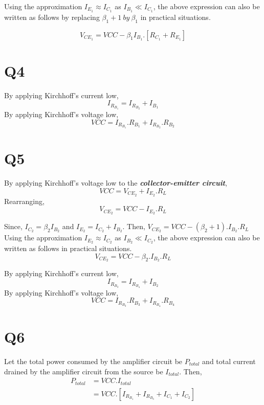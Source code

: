 Using the approximation $I_{E_1} \approx I_{C_1}$ as $I_{B_1} \ll I_{C_1}$, the above expression can also be written as follows by replacing $\beta_1 +1 ~by ~\beta_1$ in practical situations.

\[ V_{CE_1} =  VCC -\beta_1I_{B_1}.\left[R_{C_1} + R_{E_1} \right] \]


\section*{Q4}
%
By applying Kirchhoff's current low, \[I_{R_{B_1}} = I_{R_{B_2}}+I_{B_1}\]
By applying Kirchhoff's voltage low,
\[ VCC = I_{R_{B_1}}.R_{B_1} + I_{R_{B_2}}.R_{B_2} \]

\section*{Q5}
By applying Kirchhoff's voltage low to the \textbf{\textit{collector-emitter circuit}},
\[VCC = V_{CE_2} + I_{E_2}.R_L\]
Rearranging, \[ V_{CE_2} = VCC -  I_{E_2}.R_L \]

Since, $I_{C_2} = \beta_2 I_{B_2}$ and $I_{E_2} = I_{C_2} + I_{B_2}$. Then,
$ V_{CE_2} = VCC -  \left(\beta_2+1\right).I_{B_2}.R_L $\\

Using the approximation $I_{E_2} \approx I_{C_2}$ as $I_{B_2} \ll I_{C_2}$, the above expression can also be written as follows in practical situations.
\[ V_{CE_2} = VCC -  \beta_2.I_{B_2}.R_L \]

By applying Kirchhoff's current low, \[I_{R_{B_3}} = I_{R_{B_4}}+I_{B_2}\]
By applying Kirchhoff's voltage low,
\[ VCC = I_{R_{B_3}}.R_{B_3} + I_{R_{B_4}}.R_{B_4} \]

\section*{Q6}

Let  the total power consumed by the amplifier circuit be $P_{total}$ and total current drained by the amplifier circuit from the source be $I_{total}$. Then,
\[
\begin{split}
	P_{total} &= VCC.I_{total}\\
	&= VCC. \left[  I_{R_{B_1}}+  I_{R_{B_3}}+ I_{C_1}+ I_{C_2}\right]
\end{split}
\]

